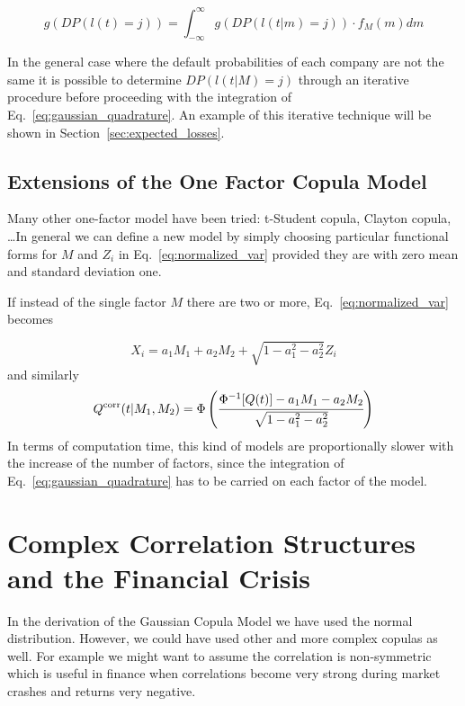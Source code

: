 \begin{equation}
g(DP(l(t) = j)) = \int_{-\infty}^{\infty}{g(DP(l(t|m) = j))\cdot f_M(m)dm}
\label{eq:gaussian_quadrature}
\end{equation}

In the general case where the default probabilities of each company are not the same it is possible to determine $DP(l(t|M)=j)$ through an iterative procedure before proceeding with the integration of Eq.~\ref{eq:gaussian_quadrature}. An example of this iterative technique will be shown in Section~\ref{sec:expected_losses}.

\subsection{Extensions of the One Factor Copula Model}
Many other one-factor model have been tried: t-Student copula, Clayton copula, \ldots In general we can define a new model by simply choosing particular functional forms for $M$ and $Z_i$ in Eq.~\ref{eq:normalized_var} provided they are with zero mean and standard deviation one. 

If instead of the single factor $M$ there are two or more, Eq.~\ref{eq:normalized_var} becomes

\begin{equation}
X_i = a_1 M_1 + a_2 M_2 + \sqrt{1 - a_1^2 - a^2_2}Z_i
\end{equation}
and similarly
\begin{equation}
Q^{\textrm{corr}}(t|M_1, M_2) = \Phi\left(\cfrac{\Phi^{-1}[Q(t)]-a_1 M_1 - a_2 M_2}{\sqrt{1 - a_1^2 - a^2_2}}\right)
\end{equation}
In terms of computation time, this kind of models are proportionally slower with the increase of the number of factors, since the integration of Eq.~\ref{eq:gaussian_quadrature} has to be carried on each factor of the model.

\section{Complex Correlation Structures and the Financial Crisis}
\label{complex-correlation-structures-and-the-financial-crisis}

In the derivation of the Gaussian Copula Model we have used the normal distribution. However, we could have used other and more complex copulas as well. For example we might want to assume the correlation is non-symmetric which is useful in finance when correlations become very strong during market crashes and returns very negative.

